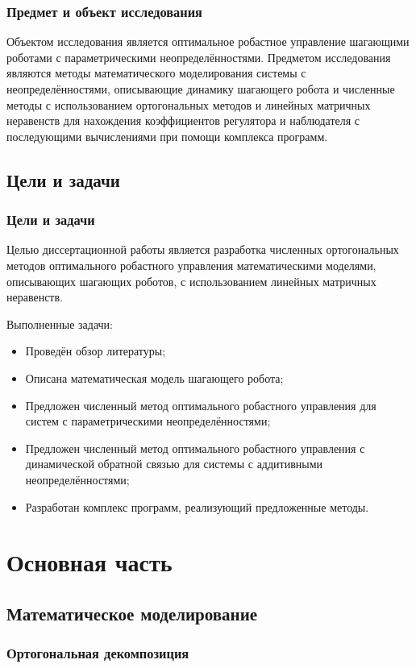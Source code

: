 \begin{frame}
    \frametitle{Предмет и объект исследования}
	Объектом исследования является оптимальное робастное управление шагающими роботами с параметрическими неопределённостями.
	\vfill
	Предметом исследования являются методы математического моделирования системы с неопределённостями, описывающие динамику шагающего робота и численные методы с использованием ортогональных методов и линейных матричных неравенств для нахождения коэффициентов регулятора и наблюдателя с последующими вычислениями при помощи комплекса программ.
\end{frame}

\subsection{Цели и задачи}

\begin{frame}
    \frametitle{Цели и задачи}
    Целью диссертационной работы является разработка численных ортогональных методов оптимального робастного управления математическими моделями, описывающих шагающих роботов, с использованием линейных матричных неравенств.
    
	Выполненные задачи:
	\begin{itemize}
		\item Проведён обзор литературы;
		\item Описана математическая модель шагающего робота;
		\item Предложен численный метод оптимального робастного управления для систем с параметрическими неопределённостями;
		\item Предложен численный метод оптимального робастного управления с динамической обратной связью для системы с аддитивными неопределённостями;
		\item Разработан комплекс программ, реализующий предложенные методы.
	\end{itemize}
\end{frame}

\section{Основная часть}

\subsection{Математическое моделирование}

\begin{frame}
    \frametitle{Ортогональная декомпозиция}
    \centering
\end{frame}

